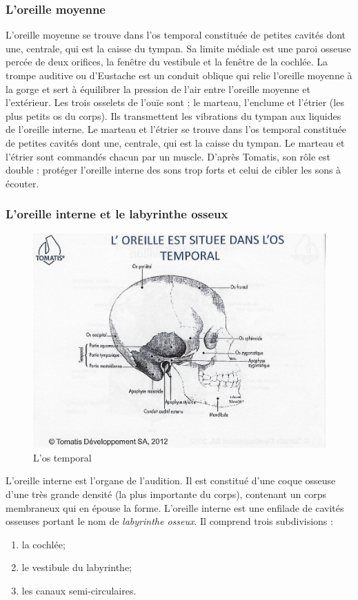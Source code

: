 \subsubsection{L'oreille moyenne}

L'oreille moyenne se trouve dans l'os temporal constituée de petites
cavités dont une, centrale, qui est la caisse du tympan. Sa limite
médiale est une paroi osseuse percée de deux orifices, la fenêtre
du vestibule et la fenêtre de la cochlée. La trompe auditive ou d'Eustache
est un conduit oblique qui relie l'oreille moyenne à la gorge et sert
à équilibrer la pression de l'air entre l'oreille moyenne et l'extérieur.
Les trois osselets de l'ouïe sont : le marteau, l'enclume et l'étrier
(les plus petits os du corps). Ils transmettent les vibrations du
tympan aux liquides de l'oreille interne. Le marteau et l'étrier se
trouve dans l'os temporal constituée de petites cavités dont une,
centrale, qui est la caisse du tympan. 
Le marteau et l'étrier sont commandés chacun par un muscle. D'après
Tomatis, son rôle est double : protéger l'oreille interne des sons
trop forts et celui de cibler les sons à écouter.

\subsubsection{L'oreille interne et le labyrinthe osseux}

\begin{figure}
	\centering
	\includegraphics[width=0.7\linewidth]{images/Loreilleostemporal_crane.jpg}
	\caption[L'os temporal]{L'os temporal}
	\label{fig:loreilleostemporal18}
\end{figure}

L'oreille interne est l'organe de l'audition. Il
est constitué d'une coque osseuse d'une très grande densité (la plus
importante du corps), contenant un corps membraneux qui en épouse
la forme. 
L'oreille interne est une enfilade de cavités osseuses portant 
le nom de \emph{labyrinthe osseux}. Il comprend trois subdivisions : 
\begin{enumerate}
	\item la cochlée;
	\item le vestibule du labyrinthe;
	\item  les canaux semi-circulaires.
\end{enumerate}

